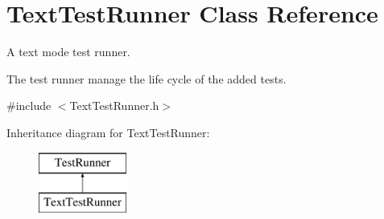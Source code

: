 \hypertarget{class_text_test_runner}{}\section{Text\+Test\+Runner Class Reference}
\label{class_text_test_runner}


A text mode test runner.

The test runner manage the life cycle of the added tests.  




{\ttfamily \#include $<$Text\+Test\+Runner.\+h$>$}

Inheritance diagram for Text\+Test\+Runner\+:\begin{figure}[H]
\begin{center}
\leavevmode
\includegraphics[height=2.000000cm]{class_text_test_runner}
\end{center}
\end{figure}
